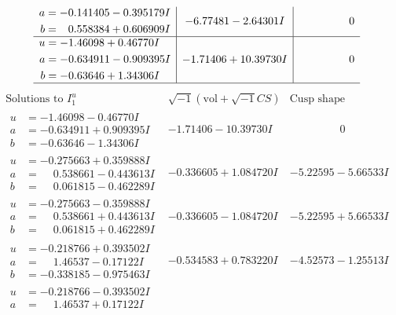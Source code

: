 \documentclass[1p]{elsarticle_modified}
\theoremstyle{definition}
\newcommand{\I}{\sqrt{-1}}
\begin{document}
$$\begin{array}{c|c|c}
\begin{aligned}
a &= -0.141405 - 0.395179 I \\
b &= \phantom{-}0.558384 + 0.606909 I\end{aligned}
 & -6.77481 - 2.64301 I & \phantom{-0.000000 } 0 \\ \hline\begin{aligned}
u &= -1.46098 + 0.46770 I \\
a &= -0.634911 - 0.909395 I \\
b &= -0.63646 + 1.34306 I\end{aligned}
 & -1.71406 + 10.39730 I & \phantom{-0.000000 } 0\\
 \hline 
 \end{array}$$\newpage$$\begin{array}{c|c|c}  
\text{Solutions to }I^u_{1}& \I (\text{vol} + \sqrt{-1}CS) & \text{Cusp shape}\\
 \hline 
\begin{aligned}
u &= -1.46098 - 0.46770 I \\
a &= -0.634911 + 0.909395 I \\
b &= -0.63646 - 1.34306 I\end{aligned}
 & -1.71406 - 10.39730 I & \phantom{-0.000000 } 0 \\ \hline\begin{aligned}
u &= -0.275663 + 0.359888 I \\
a &= \phantom{-}0.538661 - 0.443613 I \\
b &= \phantom{-}0.061815 - 0.462289 I\end{aligned}
 & -0.336605 + 1.084720 I & -5.22595 - 5.66533 I \\ \hline\begin{aligned}
u &= -0.275663 - 0.359888 I \\
a &= \phantom{-}0.538661 + 0.443613 I \\
b &= \phantom{-}0.061815 + 0.462289 I\end{aligned}
 & -0.336605 - 1.084720 I & -5.22595 + 5.66533 I \\ \hline\begin{aligned}
u &= -0.218766 + 0.393502 I \\
a &= \phantom{-}1.46537 - 0.17122 I \\
b &= -0.338185 - 0.975463 I\end{aligned}
 & -0.534583 + 0.783220 I & -4.52573 - 1.25513 I \\ \hline\begin{aligned}
u &= -0.218766 - 0.393502 I \\
a &= \phantom{-}1.46537 + 0.17122 I \\

\end{aligned}
\end{array}$$
\end{document}
